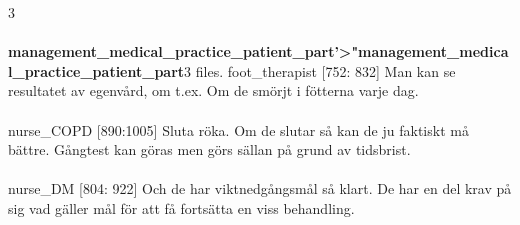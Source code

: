 \documentclass[12pt,a4paper,oneside]{article}
\begin{document}
3 \\\ \\{\bf management\_medical\_practice\_patient\_part'>"management\_medical\_practice\_patient\_part}3 files.
 foot\_therapist [752: 832] 
Man kan se  resultatet av egenv{\aa}rd,  om t.ex. Om de sm{\"o}rjt i f{\"o}tterna varje dag. %
\\\ \\
 nurse\_COPD [890:1005] 
Sluta r{\"o}ka. Om de slutar s{\aa} kan de ju faktiskt m{\aa} b{\"a}ttre. G{\aa}ngtest kan g{\"o}ras men g{\"o}rs s{\"a}llan p{\aa} grund av tidsbrist. %
\\\ \\
 nurse\_DM [804: 922] 
Och de har viktnedg{\aa}ngsm{\aa}l s{\aa} klart. De har en del krav p{\aa} sig vad g{\"a}ller m{\aa}l f{\"o}r att f{\aa} forts{\"a}tta en viss behandling. %
\end{document}
